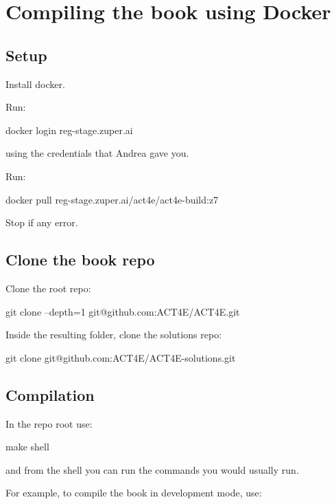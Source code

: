 
\section{Compiling the book using Docker}

\subsection{Setup}

Install docker.

Run:

\begin{console}
    docker login reg-stage.zuper.ai
\end{console}

using the credentials that Andrea gave you.

Run:

\begin{console}
    docker pull reg-stage.zuper.ai/act4e/act4e-build:z7
\end{console}

Stop if any error.

\subsection{Clone the book repo}

Clone the root repo:

\begin{console}
    git clone --depth=1 git@github.com:ACT4E/ACT4E.git
\end{console}

Inside the resulting folder, clone the solutions repo:

\begin{console}
    git clone git@github.com:ACT4E/ACT4E-solutions.git
\end{console}

\subsection{Compilation}

In the repo root use:

\begin{console}
    make shell
\end{console}

and from the shell you can run the commands you would usually run.

For example, to compile the book in development mode, use:

